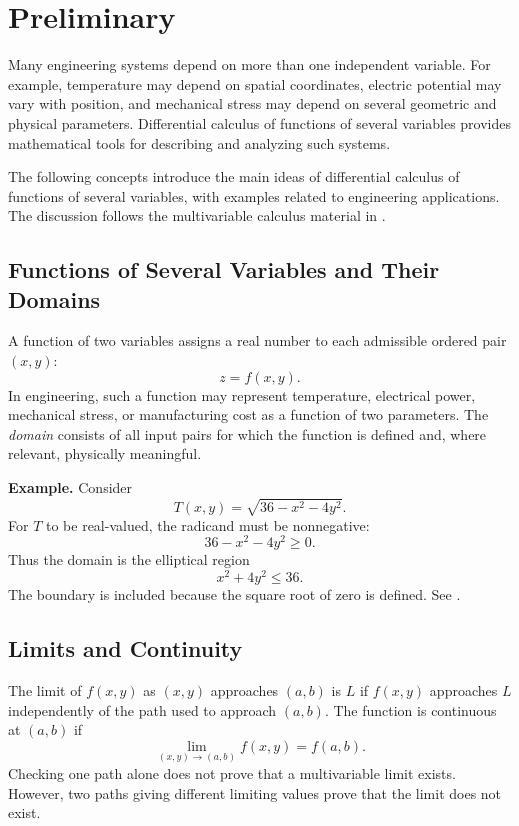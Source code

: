 \documentclass[a4paper,12pt]{article}
\theoremstyle{mystyle}
\numberwithin{equation}{section}
\numberwithin{theorem}{section}
\numberwithin{proposition}{section}
\numberwithin{example}{section}
\numberwithin{remark}{section}
\numberwithin{lemma}{section}
\numberwithin{corollary}{section}
\numberwithin{definition}{section}
\begin{document}
\section{Preliminary}
\label{S:2}
Many engineering systems depend on more than one independent
variable. For example, temperature may depend on spatial coordinates,
electric potential may vary with position, and mechanical stress may
depend on several geometric and physical parameters. Differential
calculus of functions of several variables provides mathematical tools
for describing and analyzing such systems.

The following concepts introduce the main ideas of differential
calculus of functions of several variables, with examples related
to engineering applications. The discussion follows the multivariable
calculus material in \cite{openstax2016}.

\subsection{Functions of Several Variables and Their Domains}

A function of two variables assigns a real number to each admissible ordered pair $(x,y)$:
\[
z=f(x,y).
\]
In engineering, such a function may represent temperature, electrical power, mechanical stress, or manufacturing cost as a function of two parameters. The \emph{domain} consists of all input pairs for which the function is defined and, where relevant, physically meaningful.

\textbf{Example.} Consider
\[
T(x,y)=\sqrt{36-x^2-4y^2}.
\]
For $T$ to be real-valued, the radicand must be nonnegative:
\[
36-x^2-4y^2\geq 0.
\]
Thus the domain is the elliptical region
\[
x^2+4y^2\leq 36.
\]
The boundary is included because the square root of zero is defined. See \cite[Section 4.1]{strangherman2016}.

\subsection{Limits and Continuity}

The limit of $f(x,y)$ as $(x,y)$ approaches $(a,b)$ is $L$ if $f(x,y)$ approaches $L$ independently of the path used to approach $(a,b)$. The function is continuous at $(a,b)$ if
\[
\lim_{(x,y)\to(a,b)}f(x,y)=f(a,b).
\]
Checking one path alone does not prove that a multivariable limit exists. However, two paths giving different limiting values prove that the limit does not exist.
\end{document}
